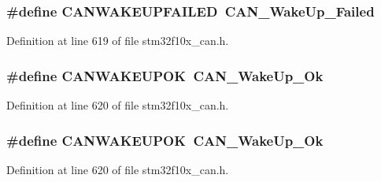 \subsubsection[{\texorpdfstring{C\+A\+N\+W\+A\+K\+E\+U\+P\+F\+A\+I\+L\+ED}{CANWAKEUPFAILED}}]{\setlength{\rightskip}{0pt plus 5cm}\#define C\+A\+N\+W\+A\+K\+E\+U\+P\+F\+A\+I\+L\+ED~{\bf C\+A\+N\+\_\+\+Wake\+Up\+\_\+\+Failed}}\hypertarget{group___c_a_n___legacy_ga0de3b0e2c544d9fa772b646e331e51b1}{}\label{group___c_a_n___legacy_ga0de3b0e2c544d9fa772b646e331e51b1}


Definition at line 619 of file stm32f10x\+\_\+can.\+h.

\subsubsection[{\texorpdfstring{C\+A\+N\+W\+A\+K\+E\+U\+P\+OK}{CANWAKEUPOK}}]{\setlength{\rightskip}{0pt plus 5cm}\#define C\+A\+N\+W\+A\+K\+E\+U\+P\+OK~{\bf C\+A\+N\+\_\+\+Wake\+Up\+\_\+\+Ok}}\hypertarget{group___c_a_n___legacy_gafed6ab4dbb00c9d63f6a7cdf323f33ef}{}\label{group___c_a_n___legacy_gafed6ab4dbb00c9d63f6a7cdf323f33ef}


Definition at line 620 of file stm32f10x\+\_\+can.\+h.

\subsubsection[{\texorpdfstring{C\+A\+N\+W\+A\+K\+E\+U\+P\+OK}{CANWAKEUPOK}}]{\setlength{\rightskip}{0pt plus 5cm}\#define C\+A\+N\+W\+A\+K\+E\+U\+P\+OK~{\bf C\+A\+N\+\_\+\+Wake\+Up\+\_\+\+Ok}}\hypertarget{group___c_a_n___legacy_gafed6ab4dbb00c9d63f6a7cdf323f33ef}{}\label{group___c_a_n___legacy_gafed6ab4dbb00c9d63f6a7cdf323f33ef}


Definition at line 620 of file stm32f10x\+\_\+can.\+h.

